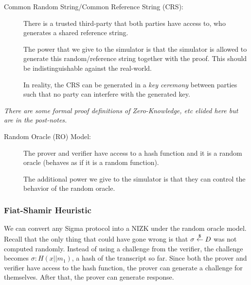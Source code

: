\begin{mdframed}[style=mdgreenbox]
    \begin{description}
        \item[Common Random String/Common Reference String (CRS):] There is a trusted third-party that both parties have access to, who generates a shared reference string.

            The power that we give to the simulator is that the simulator is allowed to generate this random/reference string together with the proof. This should be indistinguishable against the real-world.

            In reality, the CRS can be generated in a \emph{key ceremony} between parties such that no party can interfere with the generated key.

    \end{description}
    \emph{There are some formal proof definitions of Zero-Knowledge, etc elided here but are in the post-notes. }
\end{mdframed}

\begin{mdframed}[style=mdgreenbox]
    \begin{description}
        \item[Random Oracle (RO) Model:] The prover and verifier have access to a hash function and it is a random oracle (behaves as if it is a random function).

            The additional power we give to the simulator is that they can control the behavior of the random oracle.
    \end{description}
\end{mdframed}

\subsubsection{Fiat-Shamir Heuristic}\label{sec:mar7-fiat-shamir}
We can convert any Sigma protocol into a NIZK under the random oracle model. Recall that the only thing that could have gone wrong is that $\sigma\overset{\$}{\leftarrow} D$ was not computed randomly. Instead of using a challenge from the verifier, the challenge becomes $\sigma: H(x||m_1)$, a hash of the transcript so far. Since both the prover and verifier have access to the hash function, the prover can generate a challenge for themselves. After that, the prover can generate response.

